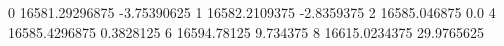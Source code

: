 0 16581.29296875 -3.75390625
1 16582.2109375 -2.8359375
2 16585.046875 0.0
4 16585.4296875 0.3828125
6 16594.78125 9.734375
8 16615.0234375 29.9765625
